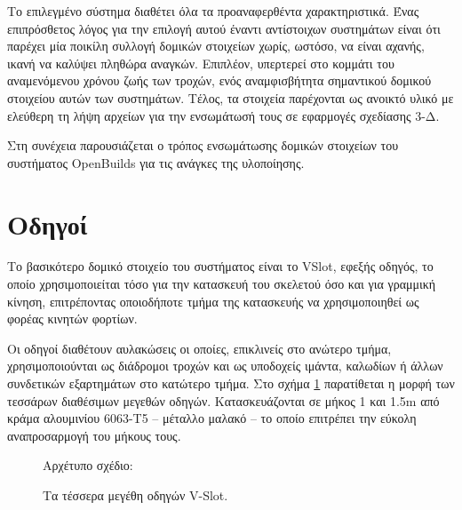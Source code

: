 Το επιλεγμένο σύστημα διαθέτει όλα τα προαναφερθέντα χαρακτηριστικά. Ένας
επιπρόσθετος λόγος για την επιλογή αυτού έναντι αντίστοιχων συστημάτων είναι
ότι παρέχει μία ποικίλη συλλογή δομικών στοιχείων χωρίς, ωστόσο, να είναι
αχανής, ικανή να καλύψει πληθώρα αναγκών. Επιπλέον, υπερτερεί στο κομμάτι του
αναμενόμενου χρόνου ζωής των τροχών, ενός αναμφισβήτητα σημαντικού δομικού
στοιχείου αυτών των συστημάτων. Τέλος, τα στοιχεία παρέχονται ως ανοικτό υλικό
με ελεύθερη τη λήψη αρχείων για την ενσωμάτωσή τους σε εφαρμογές σχεδίασης 3-Δ.


Στη συνέχεια παρουσιάζεται ο τρόπος ενσωμάτωσης δομικών στοιχείων του συστήματος
OpenBuilds για τις ανάγκες της υλοποίησης.


\section{Οδηγοί}

Το βασικότερο δομικό στοιχείο του συστήματος είναι το VSlot, εφεξής οδηγός, το
οποίο
χρησιμοποιείται τόσο για την κατασκευή του σκελετού όσο και για γραμμική κίνηση,
επιτρέποντας οποιοδήποτε τμήμα της κατασκευής να χρησιμοποιηθεί ως φορέας
κινητών φορτίων.

Οι οδηγοί διαθέτουν αυλακώσεις οι οποίες, επικλινείς στο ανώτερο τμήμα,
χρησιμοποιούνται ως διάδρομοι τροχών και ως υποδοχείς ιμάντα, καλωδίων ή άλλων
συνδετικών εξαρτημάτων στο κατώτερο τμήμα.
Στο σχήμα \ref{fig:construct:vslot} παρατίθεται η μορφή των τεσσάρων διαθέσιμων
μεγεθών οδηγών.
Κατασκευάζονται σε μήκος 1 και 1.5m από κράμα αλουμινίου 6063-T5 -- μέταλλο
μαλακό -- το οποίο επιτρέπει την εύκολη αναπροσαρμογή του μήκους τους.

\begin{figure}
    \caption{Τα τέσσερα μεγέθη οδηγών V-Slot.
    \label{fig:construct:vslot}}
    \begin{center}%
    \def\svgwidth{0.8\textwidth}
    
    \end{center}

    Αρχέτυπο σχέδιο:
\end{figure}



